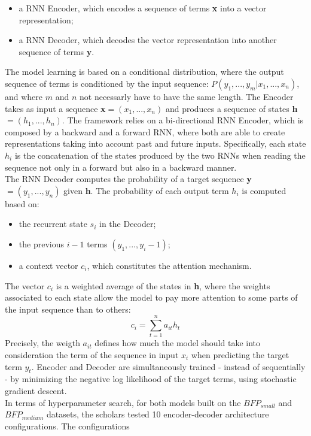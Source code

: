 \begin{itemize}
    \item a RNN Encoder, which encodes a sequence of terms \textbf{x} into a vector representation;
    \item a RNN Decoder, which decodes the vector representation into another sequence of terms \textbf{y}.
\end{itemize}
The model learning is based on a conditional distribution, where the output sequence of terms is conditioned
by the input sequence: \(P(y_1,...,y_m|x_1,...,x_n)\), and where \(m\) and \(n\) not necessarly have to have the same length.
The Encoder takes as input a sequence \textbf{x}\(= (x_1,...,x_n)\) and produces
a sequence of states \textbf{h}\(= (h_1,...,h_n)\). The framework relies on a bi-directional
RNN Encoder, which is composed by a backward and a forward RNN, where both are able to create representations taking into account
past and future inputs. Specifically, each state \(h_i\) is the concatenation of the states produced by 
the two RNNs when reading the sequence not only in a forward but also in a backward manner.\\
The RNN Decoder computes the probability of a target sequence \textbf{y}\(= (y_1,...,y_n)\) given \textbf{h}. 
The probability
of each output term \(h_i\) is computed based on:
\begin{itemize}
    \item the recurrent state \(s_i\) in the Decoder;
    \item the previous \(i - 1\) terms \((y_1,...,y_i-1)\);
    \item a context vector \(c_i\), which constitutes the attention mechanism.
\end{itemize}
The vector \(c_i\) is a weighted average of the states in \textbf{h}, where the weights associated 
to each state allow the model to pay more attention to some parts of the input sequence than to others:
\[c_i = \sum_{t=1}^n a_{it} h_t\]
Precisely, the weigth \(a_{it}\) defines how much the model should take into consideration the term of the sequence in input \(x_i\)
when predicting the target term \(y_t\). Encoder and Decoder are simultaneously trained - instead of sequentially - by minimizing
the negative log likelihood of the target terms, using stochastic gradient descent.\\
In terms of hyperparameter search, for both models built on the \(BFP_{small}\) and \(BFP_{medium}\) datasets,
the scholars tested 10 encoder-decoder architecture configurations. The configurations 
